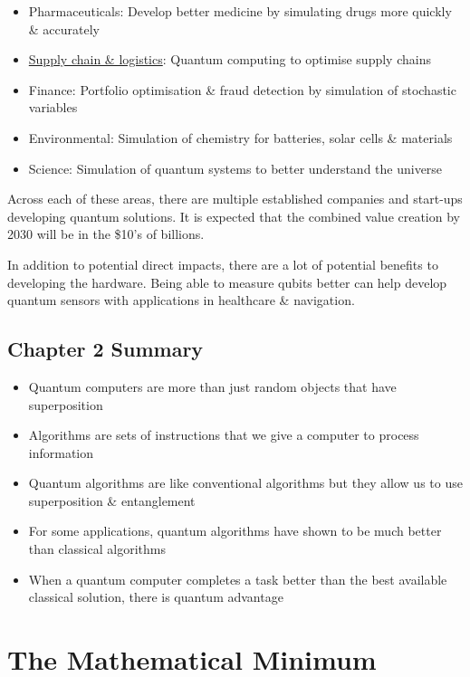 \documentclass{book}
\begin{document}
\begin{itemize}
        
    \item Pharmaceuticals: Develop better medicine by simulating drugs more quickly \& accurately  
    \item \hyperlink{https://www.youtube.com/watch?v=jA7iopqDm94}{Supply chain \& logistics}: Quantum computing to optimise supply chains 
    \item Finance: Portfolio optimisation \& fraud detection by simulation of stochastic variables
    \item Environmental: Simulation of chemistry for batteries, solar cells \& materials
    \item Science: Simulation of quantum systems to better understand the universe
    
\end{itemize}


Across each of these areas, there are multiple established companies and start-ups developing quantum solutions. It is expected that the combined value creation by 2030 will be in the \$10's of billions. 

In addition to potential direct impacts, there are a lot of potential benefits to developing the hardware. Being able to measure qubits better can help develop quantum sensors with applications in healthcare \& navigation. 


\section{Chapter 2 Summary}
\begin{itemize}
    \item Quantum computers are more than just random objects that have superposition
    \item Algorithms are sets of instructions that we give a computer to process information 
    \item Quantum algorithms are like conventional algorithms but they allow us to use superposition \& entanglement 
    \item For some applications, quantum algorithms have shown to be much better than classical algorithms
    \item When a quantum computer completes a task better than the best available classical solution, there is quantum advantage
\end{itemize}
\chapter{The Mathematical Minimum}
\end{document}
